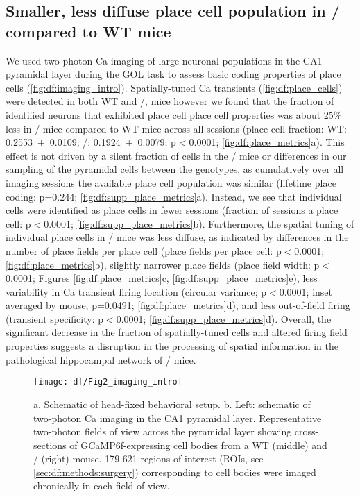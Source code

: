 \subsection{Smaller, less diffuse place cell population in \df/ compared to WT mice}

We used two-photon Ca imaging of large neuronal populations in the CA1 pyramidal layer during the GOL task to assess basic coding properties of place cells (\autoref{fig:df:imaging_intro}). Spatially-tuned Ca transients \citep{Dombeck2007} (\autoref{fig:df:place_cells}) were detected in both WT and \df/, mice however we found that the fraction of identified neurons that exhibited place cell place cell properties was about 25\% less in \df/ mice compared to WT mice across all sessions (place cell fraction: WT: 0.2553~$\pm$~0.0109; \df/: 0.1924~$\pm$~0.0079; p$<$0.0001; \autoref{fig:df:place_metrics}a).  This effect is not driven by a silent fraction of cells in the \df/ mice or differences in our sampling of the pyramidal cells between the genotypes, as cumulatively over all imaging sessions the available place cell population was similar (lifetime place coding: p=0.244; \autoref{fig:df:supp_place_metrics}a). Instead, we see that individual cells were identified as place cells in fewer sessions (fraction of sessions a place cell: p$<$0.0001; \autoref{fig:df:supp_place_metrics}b). Furthermore, the spatial tuning of individual place cells in \df/ mice was less diffuse, as indicated by differences in the number of place fields per place cell (place fields per place cell: p$<$0.0001; \autoref{fig:df:place_metrics}b), slightly narrower place fields (place field width: p$<$0.0001; Figures \ref{fig:df:place_metrics}c, \autoref{fig:df:supp_place_metrics}e), less variability in Ca transient firing location (circular variance; p$<$0.0001; inset averaged by mouse, p=0.0491; \autoref{fig:df:place_metrics}d), and less out-of-field firing (transient specificity: p$<$0.0001; \autoref{fig:df:supp_place_metrics}d).
Overall, the significant decrease in the fraction of spatially-tuned cells and altered firing field properties suggests a disruption in the processing of spatial information in the pathological hippocampal network of \df/ mice.


\begin{figure}
	\centering
	\texttt{[image: df/Fig2\_imaging\_intro]}
	\caption[Schematic of head-fixed setup and example fields of view]{a. Schematic of head-fixed behavioral setup.
	b. Left: schematic of two-photon Ca imaging in the CA1 pyramidal layer. Representative two-photon fields of view across the pyramidal layer showing cross-sections of GCaMP6f-expressing cell bodies from a WT (middle) and \df/ (right) mouse. 179-621 regions of interest (ROIs, see \autoref{sec:df:methods:surgery}) corresponding to cell bodies were imaged chronically in each field of view.}
	\label{fig:df:imaging_intro}
\end{figure}

